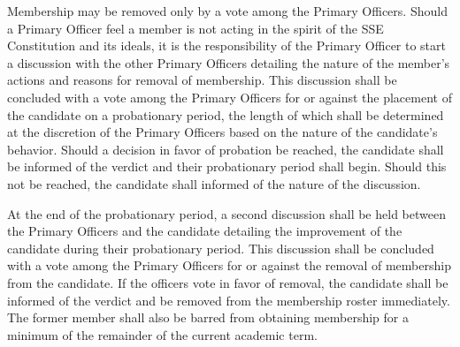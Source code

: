 \documentclass[american]{article}
\begin{document}
Membership may be removed only by a vote among the Primary Officers. Should a Primary Officer feel a member is not acting in the spirit of the SSE Constitution and its ideals, it is the responsibility of the Primary Officer to start a discussion with the other Primary Officers detailing the nature of the member's actions and reasons for removal of membership. This discussion shall be concluded with a vote among the Primary Officers for or against the placement of the candidate on a probationary period, the length of which shall be determined at the discretion of the Primary Officers based on the nature of the candidate's behavior. Should a decision in favor of probation be reached, the candidate shall be informed of the verdict and their probationary period shall begin. Should this not be reached, the candidate shall informed of the nature of the discussion.

At the end of the probationary period, a second discussion shall be held between the Primary Officers and the candidate detailing the improvement of the candidate during their probationary period. This discussion shall be concluded with a vote among the Primary Officers for or against the removal of membership from the candidate. If the officers vote in favor of removal, the candidate shall be informed of the verdict and be removed from the membership roster immediately. The former member shall also be barred from obtaining membership for a minimum of the remainder of the current academic term.
\end{document}
